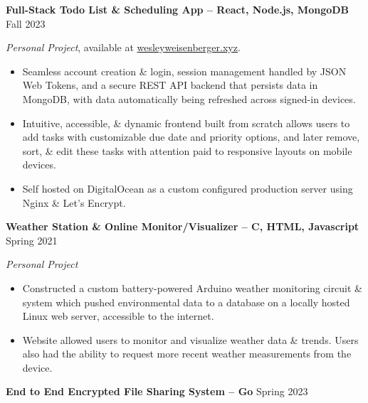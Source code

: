 \documentclass{article}
\begin{document}

\begin{adjustwidth}{1em}{1em}



    \textbf{Full-Stack Todo List \& Scheduling App -- React, Node.js, MongoDB} \hfill Fall 2023

    \textit{Personal Project}, available at \href{https://wesleyweisenberger.xyz}{wesleyweisenberger.xyz}.
    \begin{itemize}
        \item Seamless account creation \& login, session management handled by JSON Web Tokens, and a secure REST API backend that persists data in MongoDB, with data automatically being refreshed across signed-in devices.
        \item Intuitive, accessible, \& dynamic frontend built from scratch allows users to add tasks with customizable due date and priority options, and later remove, sort, \& edit these tasks with attention paid to responsive layouts on mobile devices.
        \item Self hosted on DigitalOcean as a custom configured production server using Nginx \& Let's Encrypt.
    \end{itemize}



    \vspace{1mm}



    \noindent \textbf{Weather Station \& Online Monitor/Visualizer -- C, HTML, Javascript} \hfill Spring 2021

    \textit{Personal Project}

    \begin{itemize}
        \item Constructed a custom battery-powered Arduino weather monitoring circuit \& system which pushed environmental data to a database on a locally hosted Linux web server, accessible to the internet.
        \item Website allowed users to monitor and visualize weather data \& trends. Users also had the ability to request more recent weather measurements from the device.
    \end{itemize}



    \vspace{1mm}



    \textbf{End to End Encrypted File Sharing System -- Go} \hfill Spring 2023


\end{adjustwidth}
\end{document}
